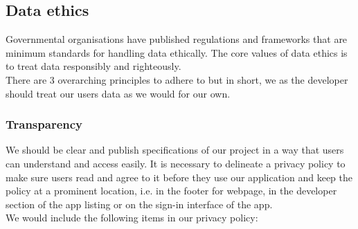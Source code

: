 \subsection{Data ethics}
\label{dataethics}
Governmental organisations have published regulations \cite{EUdataregulations2018} and frameworks
\cite{framework} that are minimum standards for handling data ethically. The core values of data ethics 
is to treat data responsibly and righteously.
\\
There are 3 overarching principles\cite{framework} to adhere to but in short, we as the developer should treat our 
users\textsc{} data as we would for our own.

\subsubsection{Transparency}
We should be clear and publish specifications of our project in a way that users can understand and access
easily. It is necessary to delineate a privacy policy to make sure users read and agree to it before they use
our application and keep the policy at a prominent location, i.e. in the footer for webpage, in the developer
section of the app listing or on the sign-in interface of the app.\\We would include the following items in our privacy policy:
